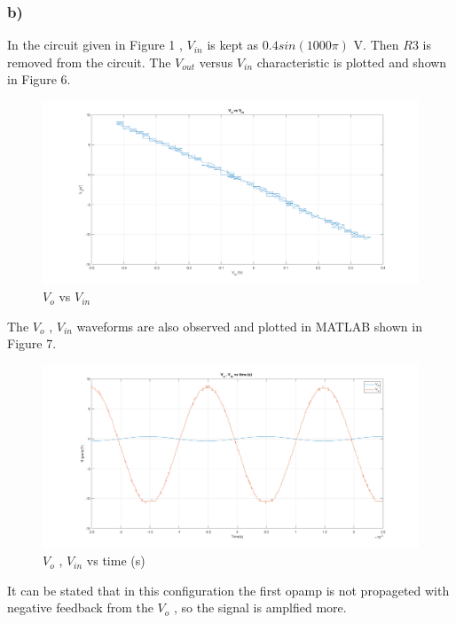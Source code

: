 \documentclass[letterpaper,12pt]{article}
\begin{document}
\subsubsection{b)}
In the circuit given in Figure 1 , \(V_{in}\) is kept as \(0.4sin(1000\pi)\) V. Then \(R3\) is removed from the circuit. The \(V_{out}\) versus \(V_{in}\) characteristic is plotted and shown in Figure 6. 


\begin{figure}[H]
	\centering
   \includegraphics[width=1\textwidth]{1b_1.png}
   \caption{\(V_{o}\) vs \(V_{in}\)}
\end{figure}
The \(V_o\) , \(V_{in}\) waveforms are also observed and plotted in MATLAB shown in Figure 7.
\begin{figure}[H]
	\centering
   \includegraphics[width=1\textwidth]{1b_2.png}
   \caption{\(V_{o}\) , \(V_{in}\) vs time (s) }
\end{figure}
It can be stated that in this configuration the first opamp is not propageted with negative feedback from the \(V_o\) , so the signal is amplfied more.  
\end{document}
